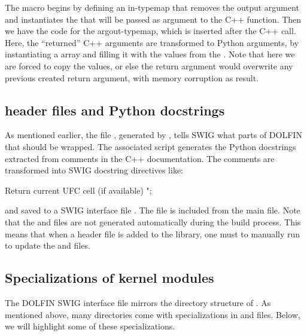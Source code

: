 The macro begins by defining an in-typemap that removes the output
argument and instantiates the  that will be passed as
argument to the C++ function. Then we have the code for the
argout-typemap, which is inserted after the C++ call. Here, the
``returned'' C++ arguments are transformed to Python arguments, by
instantiating a \numpy array  and filling it with the values
from the . Note that here we are forced to copy the
values, or else the return argument would overwrite any previous
created return argument, with memory corruption as result.

\subsection{\dolfin{} header files and Python docstrings}
As mentioned earlier, the file , generated
by , tells SWIG what parts of DOLFIN that should be
wrapped.  The associated script  generates
the Python docstrings extracted from comments in the C++ documentation.
The comments are transformed into SWIG docstring directives like:
\begin{swigcode}
Return current UFC cell (if available)
";
\end{swigcode}
and saved to a SWIG interface file . The
 file is included from the main  file.
Note that the  and  files
are not generated automatically during the build process. This means
that when a header file is added to the \dolfin{} library, one must to
manually run  to update the 
and  files.


\subsection{Specializations of kernel modules}
The DOLFIN SWIG interface file  mirrors the directory
structure of \dolfin{}. As mentioned above, many directories come
with specializations in  and 
files.  Below, we will highlight some of these specializations.

